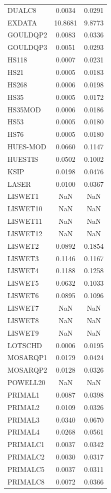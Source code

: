 \begin{longtable}{lcc}
DUALC8 & 0.0034 & 0.0291 \\
EXDATA & 10.8681 & 9.8773 \\
GOULDQP2 & 0.0083 & 0.0336 \\
GOULDQP3 & 0.0051 & 0.0293 \\
HS118 & 0.0007 & 0.0231 \\
HS21 & 0.0005 & 0.0183 \\
HS268 & 0.0006 & 0.0198 \\
HS35 & 0.0005 & 0.0172 \\
HS35MOD & 0.0006 & 0.0186 \\
HS53 & 0.0005 & 0.0180 \\
HS76 & 0.0005 & 0.0180 \\
HUES-MOD & 0.0660 & 0.1147 \\
HUESTIS & 0.0502 & 0.1002 \\
KSIP & 0.0198 & 0.0476 \\
LASER & 0.0100 & 0.0367 \\
LISWET1 & NaN & NaN \\
LISWET10 & NaN & NaN \\
LISWET11 & NaN & NaN \\
LISWET12 & NaN & NaN \\
LISWET2 & 0.0892 & 0.1854 \\
LISWET3 & 0.1146 & 0.1167 \\
LISWET4 & 0.1188 & 0.1258 \\
LISWET5 & 0.0632 & 0.1033 \\
LISWET6 & 0.0895 & 0.1096 \\
LISWET7 & NaN & NaN \\
LISWET8 & NaN & NaN \\
LISWET9 & NaN & NaN \\
LOTSCHD & 0.0006 & 0.0195 \\
MOSARQP1 & 0.0179 & 0.0424 \\
MOSARQP2 & 0.0128 & 0.0326 \\
POWELL20 & NaN & NaN \\
PRIMAL1 & 0.0087 & 0.0398 \\
PRIMAL2 & 0.0109 & 0.0326 \\
PRIMAL3 & 0.0340 & 0.0670 \\
PRIMAL4 & 0.0268 & 0.0561 \\
PRIMALC1 & 0.0037 & 0.0342 \\
PRIMALC2 & 0.0030 & 0.0317 \\
PRIMALC5 & 0.0037 & 0.0311 \\
PRIMALC8 & 0.0072 & 0.0366 \\

\end{longtable}
